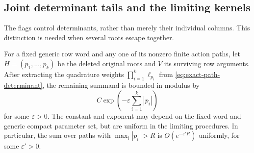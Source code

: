 \subsection{Joint determinant tails and the limiting kernels}

The flags control determinants, rather than merely their individual
columns.  This distinction is needed when several roots escape
together.

\begin{lemma}\label{lem:joint-determinant-tails}
For a fixed generic row word and any one of its nonzero finite
action paths, let $H=(p_1,\ldots,p_k)$ be the deleted original
roots and $V$ its surviving row arguments.
After extracting the quadrature weights $\prod_{i=1}^k\ell_{p_i}$
from \eqref{eq:exact-path-determinant}, the remaining summand is
bounded in modulus by
\begin{equation}\label{eq:joint-tail-majorant}
 C\exp\left(-\varepsilon\sum_{i=1}^k|p_i|\right)
\end{equation}
for some $\varepsilon>0$.  The constant and exponent may depend
on the fixed word and generic compact parameter set, but are
uniform in the limiting procedures.  In particular, the sum over
paths with $\max_i|p_i|>R$ is $O(e^{-\varepsilon'R})$ uniformly,
for some $\varepsilon'>0$.
\end{lemma}

